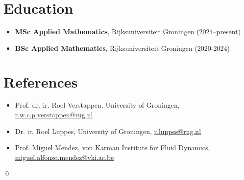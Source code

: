 \documentclass[10pt]{article}
\begin{document}
\section*{Education}
\begin{itemize}
    \item \textbf{MSc Applied Mathematics}, Rijksuniversiteit Groningen (2024--present)
    \item \textbf{BSc Applied Mathematics}, Rijksuniversiteit Groningen (2020-2024)
\end{itemize}

\section*{References}
\begin{itemize}
    \item Prof. dr. ir. Roel Verstappen, University of Groningen, \href{mailto:r.w.c.p.verstappen@rug.nl}{r.w.c.p.verstappen@rug.nl}
    \item Dr. ir. Roel Luppes, University of Groningen, \href{mailto:r.luppes@rug.nl}{r.luppes@rug.nl}
    \item Prof. Miguel Mendez, von Karman Institute for Fluid Dynamics, 
    \href{mailto:miguel.alfonso.mendez@vki.ac.be}{miguel.alfonso.mendez@vki.ac.be}
\end{itemize}

\qed
\end{document}
